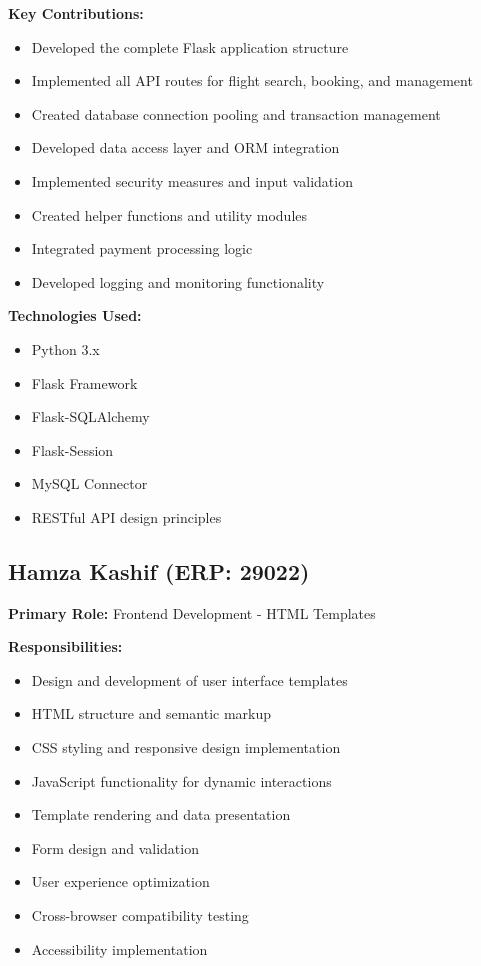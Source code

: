 \documentclass[12pt,a4paper,openany]{report}
\begin{document}
\textbf{Key Contributions:}
\begin{itemize}
    \item Developed the complete Flask application structure
    \item Implemented all API routes for flight search, booking, and management
    \item Created database connection pooling and transaction management
    \item Developed data access layer and ORM integration
    \item Implemented security measures and input validation
    \item Created helper functions and utility modules
    \item Integrated payment processing logic
    \item Developed logging and monitoring functionality
\end{itemize}

\textbf{Technologies Used:}
\begin{itemize}
    \item Python 3.x
    \item Flask Framework
    \item Flask-SQLAlchemy
    \item Flask-Session
    \item MySQL Connector
    \item RESTful API design principles
\end{itemize}

\subsection{Hamza Kashif (ERP: 29022)}

\textbf{Primary Role:} Frontend Development - HTML Templates

\textbf{Responsibilities:}
\begin{itemize}
    \item Design and development of user interface templates
    \item HTML structure and semantic markup
    \item CSS styling and responsive design implementation
    \item JavaScript functionality for dynamic interactions
    \item Template rendering and data presentation
    \item Form design and validation
    \item User experience optimization
    \item Cross-browser compatibility testing
    \item Accessibility implementation
\end{itemize}
\end{document}
